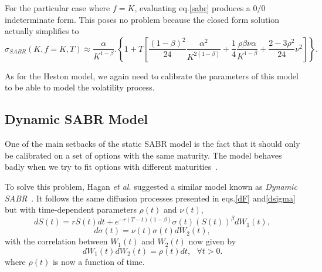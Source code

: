 For the particular case where $f=K$, evaluating eq.\eqref{sabr} produces a $0/0$ indeterminate form. This poses no problem because the closed form solution actually simplifies to~\citep{Hagan}
\begin{equation}
\sigma_{SABR}(K,f=K,T)\approx\frac{\alpha}{K^{1-\beta}}.\left\{1+T\left[\frac{(1-\beta)^2}{24}\frac{\alpha^2}{K^{2(1-\beta)}}+\frac{1}{4}\frac{\rho\beta\nu\alpha}{K^{1-\beta}}+\frac{2-3\rho^2}{24}\nu^2\right]\right\}.
\end{equation}

As for the Heston model, we again need to calibrate the parameters of this model to be able to model the volatility process.


\subsection{Dynamic SABR Model}
\label{subsection:Dynamic SABR Model}
One of the main setbacks of the static SABR model is the fact that it should only be calibrated on a set of options with the same maturity. The model behaves badly when we try to fit options with different maturities~\citep{Hagan}. 

To solve this problem, Hagan \textit{et al.} suggested a similar model known as \emph{Dynamic SABR}~\citep{Hagan}. It follows the same diffusion processes presented in eqs.\eqref{dF} and\eqref{dsigma} but with time-dependent parameters $\rho(t)$ and $\nu(t)$,
\begin{equation}\label{dF2}
\boxed{dS(t)=rS(t)dt+e^{-r(T-t)(1-\beta)}\sigma(t) (S(t))^\beta dW_1(t),}
\end{equation}
\begin{equation}\label{dsigma2}
\boxed{d\sigma(t)=\nu(t)\sigma(t) dW_2(t),}
\end{equation}
\noindent with the correlation between $W_1(t)$ and $W_2(t)$ now given by
\begin{equation}
dW_1(t)dW_2(t)=\rho(t) dt, \ \ \ \forall t>0.
\end{equation}
\noindent where $\rho(t)$ is now a function of time.



